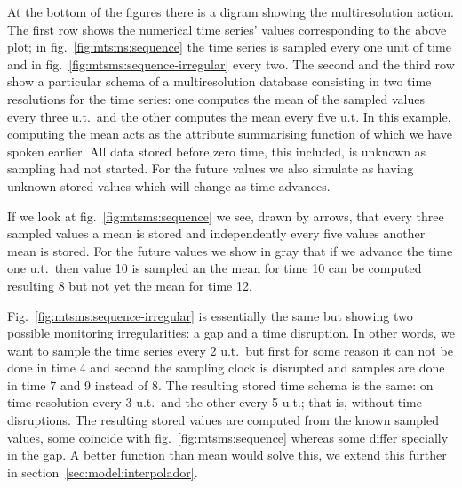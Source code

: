 At the bottom of the figures there is a digram showing the
multiresolution action. The first row shows the numerical time series'
values corresponding to the above plot; in
fig.~\ref{fig:mtsms:sequence} the time series is sampled every one
unit of time and in fig.~\ref{fig:mtsms:sequence-irregular} every
two. The second and the third row show a particular schema of a
multiresolution database consisting in two time resolutions for the
time series: one computes the mean of the sampled values every three
u.t.\ and the other computes the mean every five u.t. In this example,
computing the mean acts as the attribute summarising function of which
we have spoken earlier. All data stored before zero time, this
included, is unknown as sampling had not started. For the future
values we also simulate as having unknown stored values which will
change as time advances.

If we look at fig.~\ref{fig:mtsms:sequence} we see, drawn by arrows,
that every three sampled values a mean is stored and independently
every five values another mean is stored. For the future values we
show in gray that if we advance the time one u.t.\ then value 10 is
sampled an the mean for time 10 can be computed resulting 8 but not
yet the mean for time 12.

Fig.~\ref{fig:mtsms:sequence-irregular} is essentially the same but
showing two possible monitoring irregularities: a gap and a time
disruption. In other words, we want to sample the time series every 2
u.t.\ but first for some reason it can not be done in time 4 and
second the sampling clock is disrupted and samples are done in time 7
and 9 instead of 8. The resulting stored time schema is the same: on
time resolution every 3 u.t.\ and the other every 5 u.t.; that is,
without time disruptions. The resulting stored values are computed
from the known sampled values, some coincide with
fig.~\ref{fig:mtsms:sequence} whereas some differ specially in the
gap. A better function than mean would solve this, we extend this
further in section~\ref{sec:model:interpolador}.





